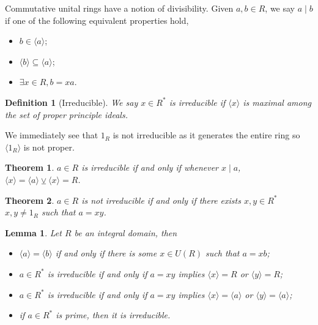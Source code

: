 \documentclass[
]{article}
\newtheorem{theorem}{Theorem}
\newtheorem{lemma}{Lemma}
\newtheorem{definition}{Definition}[theorem]
\begin{document}
Commutative unital rings have a notion of divisibility. Given
\(a, b \in R\), we say \(a \mid b\) if one of the following equivalent
properties hold,

\begin{itemize}
  \item \(b \in \langle a \rangle\);
  \item \(\langle b \rangle \subseteq \langle a \rangle\);
  \item \(\exists x \in R, b = xa\).
\end{itemize}

\begin{definition}[Irreducible]
  We say \(x \in R^*\) is irreducible if \(\langle x \rangle\) is maximal among 
  the set of proper principle ideals.
\end{definition}

We immediately see that \(1_R\) is not irreducible as it generates the
entire ring so \(\langle 1_R \rangle\) is not proper.

\begin{theorem}
  \(a \in R\) is irreducible if and only if whenever \(x \mid a\), 
  \(\langle x \rangle = \langle a \rangle \veebar \langle x \rangle = R\).
\end{theorem}

\begin{theorem}\label{not_irreducible_iff}
  \(a \in R\) is not irreducible if and only if there exists \(x, y \in R^*\) 
  \(x, y \neq 1_R\) such that \(a = xy\).
\end{theorem}

\begin{lemma}
  Let \(R\) be an integral domain, then
  \begin{itemize}
    \item \(\langle a \rangle = \langle b \rangle\) if and only if there is some 
      \(x \in U(R)\) such that \(a = xb\);
    \item \(a \in R^*\) is irreducible if and only if \(a = xy\) implies 
      \(\langle x \rangle = R\) or \(\langle y \rangle = R\);
    \item \(a \in R^*\) is irreducible if and only if \(a = xy\) implies 
      \(\langle x \rangle = \langle a \rangle\) or 
      \(\langle y \rangle = \langle a \rangle\);
    \item if \(a \in R^*\) is prime, then it is irreducible.
  \end{itemize}
\end{lemma}
\proof
\end{document}
